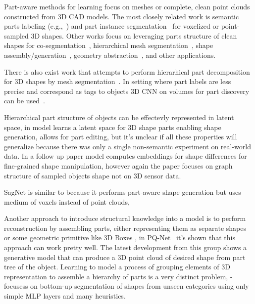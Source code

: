 
Part-aware methods for learning  focus on meshes or complete, clean point clouds constructed from 3D CAD models. The most closely related work  is semantic parts labeling (e.g.,~\cite{yi2016scalable,wang2017cnn,qi2017pointnet,mo2019partnet,yi2019gspn,zhang2019point}) and part instance segmentation~\cite{zhang2019point} for voxelized or point-sampled 3D shapes. Other works focus on leveraging parts structure of clean shapes for co-segmentation~\cite{chen2019bae,zhu2019cosegnet}, hierarchical mesh segmentation~\cite{yi2017learning}, shape assembly/generation~\cite{mo2019structurenet,wu2019sagnet,wu2019pq,mo2020pt2pc}, geometry abstraction~\cite{russell2009associative,li2017grass,sun2019learning}, and other applications.

There is also exist work that attempts to perform hierarhical part decomposition for 3D shapes by mesh segmentation~\cite{yi2017learning}. In setting where part labels are less precise and correspond as tags to objects 3D CNN on volumes for part discovery can be used~\cite{muralikrishnan2018tags2parts}.

Hierarchical part structure of objects can be effectevly represented in latent space, in \cite{mo2019structurenet} model learns a latent space for 3D shape parts enabling shape generation, allows for part editing, but it's unclear if all these properties will generalize because there was only a single non-semantic experiment on real-world data. In a follow up paper \cite{mo2020structedit} model computes embeddings for shape differences for fine-grained shape manipulation, however again the paper focuses on graph structure of sampled objects shape not on 3D sensor data.

SagNet \cite{wu2019sagnet} is similar to \cite{mo2019structurenet} because it performs part-aware shape generation but uses medium of voxels instead of point clouds,

Another approach to introduce structural knowledge into a model is to perform reconstruction by assembling parts, either representing them as separate shapes or some geometric primitive like 3D Boxes \cite{sun2019learning}, in PQ-Net~\cite{wu2020pq} it's shown that this approach can work pretty well. The latest development from this group \cite{mo2020pt2pc} shows a generative model that can produce a 3D point cloud of desired shape from part tree of the object.
Learning to model a process of grouping elements of 3D representation to assemble a hierarchy of parts is a very distinct problem, \cite{luo2020learning} - focusess on bottom-up segmentation of shapes from unseen categories using only simple MLP layers and many heuristics. 

